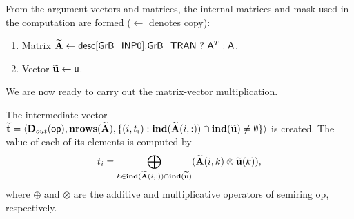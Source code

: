 From the argument vectors and matrices, the internal matrices and mask used in 
the computation are formed ($\leftarrow$ denotes copy):  
\begin{enumerate}
	\item Matrix ${\bf \widetilde{A}} \leftarrow {\sf desc[GrB\_INP0].GrB\_TRAN} \ ? \ {\sf A}^T : {\sf A}$.

	\item Vector ${\bf \widetilde{u}} \leftarrow {\sf u}$.
\end{enumerate}


We are now ready to carry out the matrix-vector multiplication.

The intermediate vector ${\bf \widetilde{t}} = \langle
\mbox{$\mathbf{D}_{out}$}({\sf op}), \bold{nrows}({\bf \widetilde{A}}),
\{(i,t_i) : \bold{ind}({\bf \widetilde{A}}(i,:)) \cap 
\bold{ind}({\bf \widetilde{u}}) \neq \emptyset \} \rangle$
is created.  The value of each of its elements is computed by 
\[t_i = \bigoplus_{k \in \bold{ind}({\bf \widetilde{A}}(i,:)) \cap
\bold{ind}({\bf \widetilde{u}})} ({\bf \widetilde{A}}(i,k)
\otimes {\bf \widetilde{u}}(k)),\] where $\oplus$ and $\otimes$
are the additive and multiplicative operators of semiring {\sf op},
respectively.

